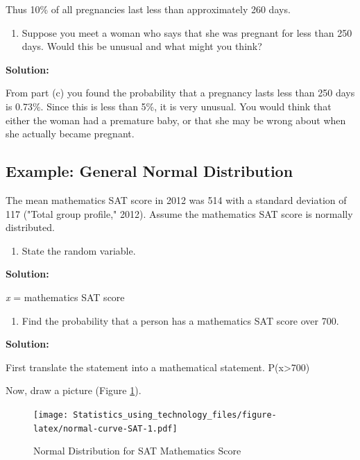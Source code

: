 \documentclass[
]{book}
\providecommand{\tightlist}{%
  \setlength{\itemsep}{0pt}\setlength{\parskip}{0pt}}
\begin{document}
Thus 10\% of all pregnancies last less than approximately 260 days.

\begin{enumerate}
\def\labelenumi{\alph{enumi}.}
\setcounter{enumi}{5}
\tightlist
\item
  Suppose you meet a woman who says that she was pregnant for less than 250 days. Would this be unusual and what might you think?
\end{enumerate}

\textbf{Solution:}

From part (c) you found the probability that a pregnancy lasts less than 250 days is 0.73\%. Since this is less than 5\%, it is very unusual. You would think that either the woman had a premature baby, or that she may be wrong about when she actually became pregnant.

\hypertarget{example-general-normal-distribution-1}{%
\subsection{Example: General Normal Distribution}\label{example-general-normal-distribution-1}}

The mean mathematics SAT score in 2012 was 514 with a standard deviation of 117 ("Total group profile," 2012). Assume the mathematics SAT score is normally distributed.

\begin{enumerate}
\def\labelenumi{\alph{enumi}.}
\tightlist
\item
  State the random variable.
\end{enumerate}

\textbf{Solution:}

\emph{x} = mathematics SAT score

\begin{enumerate}
\def\labelenumi{\alph{enumi}.}
\setcounter{enumi}{1}
\tightlist
\item
  Find the probability that a person has a mathematics SAT score
  over 700.
\end{enumerate}

\textbf{Solution:}

First translate the statement into a mathematical statement. P(x\textgreater700)

Now, draw a picture (Figure \ref{fig:normal-curve-SAT}).



\begin{figure}
\centering
\texttt{[image: Statistics\_using\_technology\_files/figure-latex/normal-curve-SAT-1.pdf]}
\caption{\label{fig:normal-curve-SAT}Normal Distribution for SAT Mathematics Score}
\end{figure}
\end{document}

